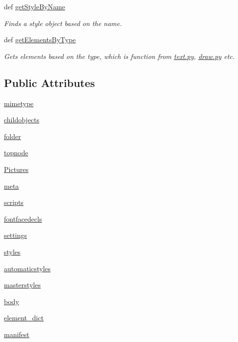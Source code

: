 \begin{DoxyCompactItemize}
def \hyperlink{classodf_1_1opendocument_1_1OpenDocument_ac499f824523aa0bfec3dd6f5f6ae302f}{get\+Style\+By\+Name}
\begin{DoxyCompactList}\small\item\em Finds a style object based on the name. \end{DoxyCompactList}\item 
def \hyperlink{classodf_1_1opendocument_1_1OpenDocument_a2b84e16f84a05005ae4a9840bf8c91b1}{get\+Elements\+By\+Type}
\begin{DoxyCompactList}\small\item\em Gets elements based on the type, which is function from \hyperlink{text_8py}{text.\+py}, \hyperlink{draw_8py}{draw.\+py} etc. \end{DoxyCompactList}\end{DoxyCompactItemize}
\subsection*{Public Attributes}
\begin{DoxyCompactItemize}
\item 
\hyperlink{classodf_1_1opendocument_1_1OpenDocument_a7aa1e6e714802e1062e8cedc8389accd}{mimetype}
\item 
\hyperlink{classodf_1_1opendocument_1_1OpenDocument_a4988e1e8d4d5b1ce896209f6efd3bb42}{childobjects}
\item 
\hyperlink{classodf_1_1opendocument_1_1OpenDocument_afcefb2363e0766829087469c5a2143d0}{folder}
\item 
\hyperlink{classodf_1_1opendocument_1_1OpenDocument_a8bee919284edd7ff59982d04db3ae982}{topnode}
\item 
\hyperlink{classodf_1_1opendocument_1_1OpenDocument_a93287d676473594226d2ead2784e431e}{Pictures}
\item 
\hyperlink{classodf_1_1opendocument_1_1OpenDocument_a6dd5a93c11c28823e1c2abf73a019769}{meta}
\item 
\hyperlink{classodf_1_1opendocument_1_1OpenDocument_a951448b0dd86f2e681de75b53b64af3d}{scripts}
\item 
\hyperlink{classodf_1_1opendocument_1_1OpenDocument_a7ae9414a4c75f72ef776f2935a912b5a}{fontfacedecls}
\item 
\hyperlink{classodf_1_1opendocument_1_1OpenDocument_a60cfe030a636b00d6ccf16a99159ff31}{settings}
\item 
\hyperlink{classodf_1_1opendocument_1_1OpenDocument_a609b7798d88612693837d38dd389ed40}{styles}
\item 
\hyperlink{classodf_1_1opendocument_1_1OpenDocument_a7c3bf1a7904a57be3863ffa6683fa4a1}{automaticstyles}
\item 
\hyperlink{classodf_1_1opendocument_1_1OpenDocument_a86acdec5e5d8fcb48e2ab5c8bfc98559}{masterstyles}
\item 
\hyperlink{classodf_1_1opendocument_1_1OpenDocument_a47cb65b29dfaaf3697c02cb166fbdab3}{body}
\item 
\hyperlink{classodf_1_1opendocument_1_1OpenDocument_a2a15b47d7741f4124760f7894fa6f41a}{element\+\_\+dict}
\item 
\hyperlink{classodf_1_1opendocument_1_1OpenDocument_a9711036b13566a608fe7e29d9e7c6dd8}{manifest}
\end{DoxyCompactItemize}
